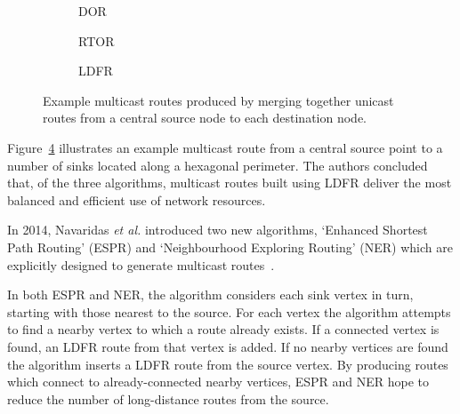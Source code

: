 			\begin{figure}
				\center
				\begin{subfigure}{0.3\linewidth}
					\center
					
					\caption{DOR}
					\label{fig:simple-routers-dor}
				\end{subfigure}
				\begin{subfigure}{0.3\linewidth}
					\center
					
					\caption{RTOR}
					\label{fig:simple-routers-dor}
				\end{subfigure}
				\begin{subfigure}{0.3\linewidth}
					\center
					
					\caption{LDFR}
					\label{fig:simple-routers-dor}
				\end{subfigure}
				
				\caption[Multicast routes produced by merging unicast routes.]%
				{Example multicast routes produced by merging together unicast
				routes from a central source node to each destination node.}
				\label{fig:simple-routers}
			\end{figure}
			
			Figure~\ref{fig:simple-routers} illustrates an example multicast route
			from a central source point to a number of sinks located along a
			hexagonal perimeter. The authors concluded that, of the three algorithms,
			multicast routes built using LDFR deliver the most balanced and efficient
			use of network resources.
			
			In 2014, Navaridas \emph{et al.} introduced two new algorithms, `Enhanced
			Shortest Path Routing' (ESPR) and `Neighbourhood Exploring Routing' (NER)
			which are explicitly designed to generate multicast
			routes~\cite{navaridas14}.
			
			In both ESPR and NER, the algorithm considers each sink vertex in turn,
			starting with those nearest to the source. For each vertex the algorithm
			attempts to find a nearby vertex to which a route already exists. If a
			connected vertex is found, an LDFR route from that vertex is added. If no
			nearby vertices are found the algorithm inserts a LDFR route from the
			source vertex. By producing routes which connect to already-connected
			nearby vertices, ESPR and NER hope to reduce the number of long-distance
			routes from the source.
			
